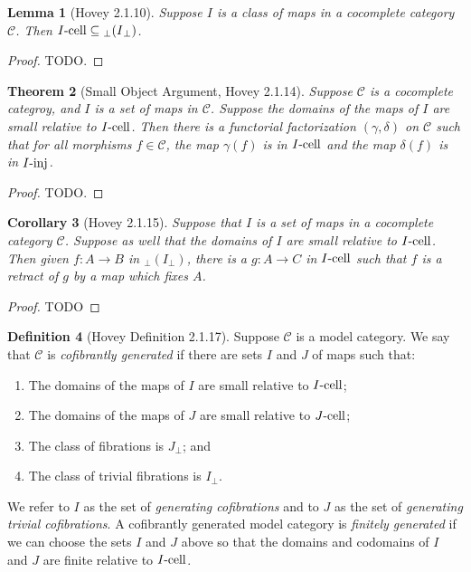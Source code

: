 \documentclass{amsart}
\theoremstyle{plain}
\newtheorem{theorem}{Theorem}[section]
\newtheorem{corollary}[theorem]{Corollary}
\newtheorem{lemma}[theorem]{Lemma}
\theoremstyle{definition}
\newtheorem{definition}[theorem]{Definition}
\newcommand{\sseq}{\subseteq}
\newcommand{\0}{\mathbf{0}}
\newcommand{\cC}{\mathcal C}
\newcommand{\p}{{_\perp}}
\renewcommand{\(}{\left(}
\renewcommand{\)}{\right)}
\newcommand{\inj}{\text-\mathrm{inj}}
\newcommand{\cell}{\text-\mathrm{cell}}
\begin{document}
\begin{lemma}[Hovey 2.1.10]\label{2.1.10}
  Suppose $I$ is a class of maps in a cocomplete category $\cC$. Then $I\cell\sseq{\p(I\p)}$.
\end{lemma}
\begin{proof}
  \color{red}TODO.
\end{proof}

\begin{theorem}[Small Object Argument, Hovey 2.1.14]\label{2.1.14}
  Suppose $\cC$ is a cocomplete categroy, and $I$ is a set of maps in $\cC$. Suppose the domains of the maps of $I$ are small relative to $I\cell$. Then there is a functorial factorization $(\gamma,\delta)$ on $\cC$ such that for all morphisms $f\in\cC$, the map $\gamma(f)$ is in $I\cell$ and the map $\delta(f)$ is in $I\inj$.
\end{theorem}
\begin{proof}
  \color{red}TODO.
\end{proof}

\begin{corollary}[Hovey 2.1.15]\label{2.1.15}
  Suppose that $I$ is a set of maps in a cocomplete category $\cC$. Suppose as well that the domains of $I$ are small relative to $I\cell$. Then given $f:A\to B$ in $\p(I\p)$, there is a $g:A\to C$ in $I\cell$ such that $f$ is a retract of $g$ by a map which fixes $A$.
\end{corollary}
\begin{proof}
  \color{red}TODO
\end{proof}

\begin{definition}[Hovey Definition 2.1.17]\label{2.1.17}
  Suppose $\cC$ is a model category. We say that $\cC$ is \textit{cofibrantly generated} if there are sets $I$ and $J$ of maps such that:\begin{enumerate}[label=\arabic*.,noitemsep,topsep=0pt]
    \item The domains of the maps of $I$ are small relative to $I\cell$;
    \item The domains of the maps of $J$ are small relative to $J\cell$;
    \item The class of fibrations is $J\p$; and
    \item The class of trivial fibrations is $I\p$.
  \end{enumerate}
  We refer to $I$ as the set of \textit{generating cofibrations} and to $J$ as the set of \textit{generating trivial cofibrations}. A cofibrantly generated model category is \textit{finitely generated} if we can choose the sets $I$ and $J$ above so that the domains and codomains of $I$ and $J$ are finite relative to $I\cell$.
\end{definition}
\end{document}
